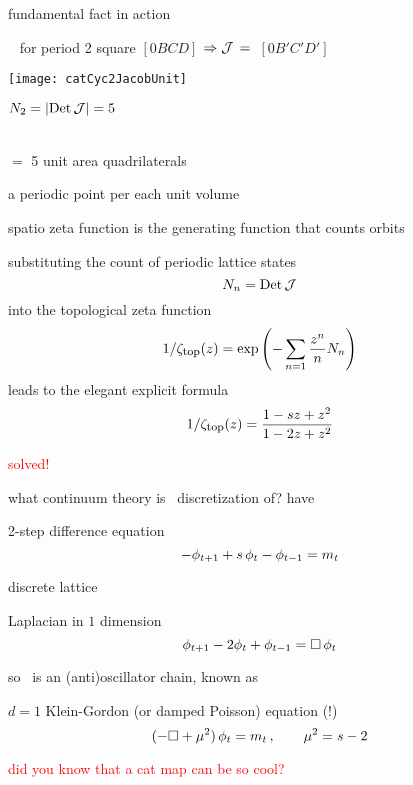 \begin{frame}{fundamental fact in action}
    \begin{block}{\templatt\  {\fundPip} for period 2}
square $[0BCD]$
$\Rightarrow{\ensuremath{\cal J}}\,=\,$
{\fundPip} $[0B'C'D']$
\bigskip

\begin{center}
            \begin{minipage}[c]{0.32\textwidth}\begin{center}
\texttt{[image: catCyc2JacobUnit]}
            \end{center}\end{minipage}
            \hspace{2ex}
            \begin{minipage}[c]{0.46\textwidth}
$N_2=|\mbox{\rm Det}\,{\cal J}|=5$
\medskip

{\fundPip} \\
$=$  5 unit area quadrilaterals
            \end{minipage}
\end{center}
a periodic point per each unit volume
    \end{block}
\end{frame} %

\begin{frame}{{\color{orange}spatio}{\templatt}  zeta function}
is the generating function that counts {\color{blue}orbits}
\medskip

substituting the {\color{blue}\HillDet} count of periodic lattice states
\[
N_n = \mbox{\rm Det}\,{\cal J}
\]
into the
{topological} zeta func\-tion
\[
1/\zeta_{\mbox{\footnotesize top}} (z)
  =   \exp \left(
    -\sum_{n=1} \frac{z^n}{n} N_n
    \right)
\]%
leads to the elegant explicit formula
\[
1/\zeta_{\mbox{\footnotesize top}} (z)
 =  \frac{1 - s z + z^2}
         {1 - 2z + z^2}
\]%


\vfill\hfill
{\Huge \textcolor{red}{solved!}}
\end{frame} %

\begin{frame}{what continuum theory is \templatt\ discretization of?}
have
\begin{block}{2-step difference equation}
\[
- \phi_{t+1} + s \, \phi_{t} - \phi_{t-1}
    =
{m_{t}}
\] %
\end{block}
discrete lattice
\begin{block}{Laplacian in $1$ dimension}
\[
\phi_{t+1} - 2\phi_{t} + \phi_{t-1}
     =
\Box\,\phi_t
\]
\end{block}
\medskip

so \templatt\ is an (anti)oscillator chain, known as
\begin{block}{$d=1$ Klein-Gordon (or damped Poisson) equation (!)}
\[
 (-\Box + {\mu}^2)\,\phi_{t} = m_t
\,, \qquad
{\mu}^2= s-2
\] %
\end{block}
\vfill\hfill
\textcolor{red}{did you know that a cat map can be so cool?}
\end{frame} %

